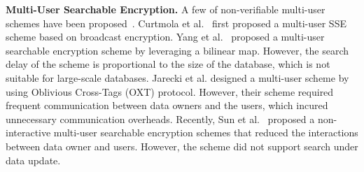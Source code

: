 \noindent\textbf{Multi-User Searchable Encryption.} A few of non-verifiable multi-user schemes have been proposed~\cite{curtmola2011searchable,yang2009multiuser,jarecki2013outsourced,sun2016efficient}. Curtmola et al.~\cite{curtmola2011searchable} first proposed a multi-user SSE scheme based on broadcast encryption. Yang et al.~\cite{yang2009multiuser} proposed a multi-user searchable encryption scheme by leveraging a bilinear map. However, the search delay of the scheme is proportional to the size of the database, which is not suitable for large-scale databases.
Jarecki et al. \cite{jarecki2013outsourced} designed a multi-user scheme by using Oblivious Cross-Tags (OXT) protocol. However, their scheme required frequent communication between data owners and the users, which incured unnecessary communication overheads. Recently, Sun et al.~\cite{sun2016efficient} proposed a non-interactive multi-user searchable encryption schemes that reduced the interactions between data owner and users. However, the scheme did not support search under data update.
